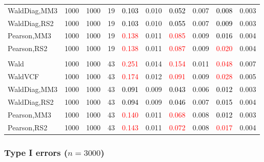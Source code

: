 \documentclass[
]{article}
\begin{document}
\begin{table}[H]
{\begin{tabular}[t]{lrrrrrrlrr}
\hspace{1em}WaldDiag,MM3 & 1000 & 1000 & 19 & \textcolor{black}{0.103} & 0.010 & \textcolor{black}{0.052} & 0.007 & \textcolor{black}{0.008} & 0.003\\
\hspace{1em}WaldDiag,RS2 & 1000 & 1000 & 19 & \textcolor{black}{0.103} & 0.010 & \textcolor{black}{0.055} & 0.007 & \textcolor{black}{0.009} & 0.003\\
\hspace{1em}Pearson,MM3 & 1000 & 1000 & 19 & \textcolor{red}{0.138} & 0.011 & \textcolor{red}{0.085} & 0.009 & \textcolor{black}{0.016} & 0.004\\
\hspace{1em}Pearson,RS2 & 1000 & 1000 & 19 & \textcolor{red}{0.138} & 0.011 & \textcolor{red}{0.087} & 0.009 & \textcolor{red}{0.020} & 0.004\\
\addlinespace[0.3em]
\multicolumn{10}{l}{\textbf{3F 15V}}\\
\hspace{1em}Wald & 1000 & 1000 & 43 & \textcolor{red}{0.251} & 0.014 & \textcolor{red}{0.154} & 0.011 & \textcolor{red}{0.048} & 0.007\\
\hspace{1em}WaldVCF & 1000 & 1000 & 43 & \textcolor{red}{0.174} & 0.012 & \textcolor{red}{0.091} & 0.009 & \textcolor{red}{0.028} & 0.005\\
\hspace{1em}WaldDiag,MM3 & 1000 & 1000 & 43 & \textcolor{black}{0.091} & 0.009 & \textcolor{black}{0.043} & 0.006 & \textcolor{black}{0.012} & 0.003\\
\hspace{1em}WaldDiag,RS2 & 1000 & 1000 & 43 & \textcolor{black}{0.094} & 0.009 & \textcolor{black}{0.046} & 0.007 & \textcolor{black}{0.015} & 0.004\\
\hspace{1em}Pearson,MM3 & 1000 & 1000 & 43 & \textcolor{red}{0.140} & 0.011 & \textcolor{red}{0.068} & 0.008 & \textcolor{black}{0.012} & 0.003\\
\hspace{1em}Pearson,RS2 & 1000 & 1000 & 43 & \textcolor{red}{0.143} & 0.011 & \textcolor{red}{0.072} & 0.008 & \textcolor{red}{0.017} & 0.004\\
\bottomrule
\end{tabular}}
\endgroup{}
\end{table}

\hypertarget{type-i-errors-n3000-3}{%
\subsubsection{\texorpdfstring{Type I errors
(\(n=3000\))}{Type I errors (n=3000)}}\label{type-i-errors-n3000-3}}
\end{document}
